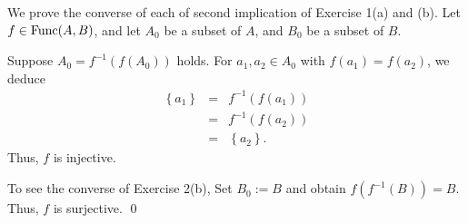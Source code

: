 \documentclass[a4paper,12pt]{article}
\begin{document}
\begin{rem}
	We prove the converse of each of second implication of Exercise 1(a) and (b).
	Let
	\( f\in \mathrm{Func}(A,B)\),
	and let
	\( A_0 \)
	be a subset of \( A \),
	and
	\( B_0\)
	be a subset of \( B \).
	
	Suppose
	\( A_0 = f ^{-1}(f(A_0)) \)
	holds.
	For
	\(a_1, a_2 \in A_0\)
	with
	\(f(a_1) = f(a_2)\),
	we deduce
	\begin{eqnarray*}
		\left\{ a_1 \right\}
		&=& f ^{-1}\left( f(a_1) \right)\\
		&=& f ^{-1}\left( f(a_2) \right)\\
		&=& \left\{ a_2 \right\}.
	\end{eqnarray*}
	Thus,
	\( f \)
	is injective.
	
	To see the converse of Exercise 2(b),
	Set \( B_0 := B \)
	and obtain
	\(f \left( f ^{-1}(B) \right) = B\).
	Thus,
	\(f\)
	is surjective.
	\qed\end{rem}
\end{document}
